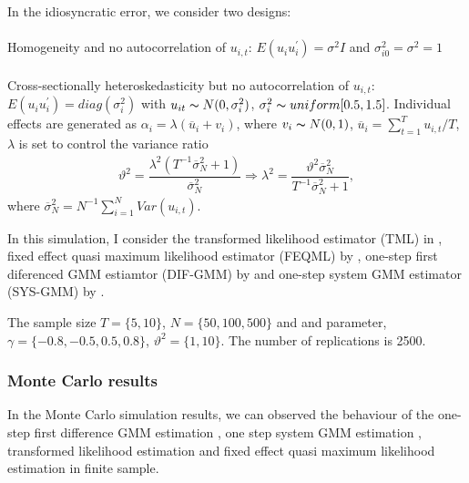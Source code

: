 \documentclass[12pt,a4paper,hyperref]{article}
\begin{document}
In the idiosyncratic error, we consider two designs: \\ \\
\uppercase\expandafter{} Homogeneity and no autocorrelation of $u_{i,t}$: $E(u_{i}u_{i}^{'})=\sigma^{2}I$ and $\sigma^{2}_{i0}=\sigma^{2}=1$ \\ \\
\uppercase\expandafter{} Cross-sectionally heteroskedasticity but no autocorrelation of $u_{i,t}$: $E(u_{i}u_{i}^{'})=diag(\sigma^{2}_{i})$ with $u_{it}\thicksim N(0, \sigma^{2}_{i})$, $\sigma^{2}_{i} \thicksim uniform[0.5, 1.5]$. Individual effects are generated as $\alpha_{i}=\lambda (\overline{u}_{i}+v_{i})$, where $v_{i} \thicksim N(0,1)$, $\overline{u}_{i}=\sum_{t=1}^{T}u_{i,t}/T$, $\lambda$ is set to control the variance ratio
\begin{align}
\vartheta^{2}=\dfrac{\lambda^{2}(T^{-1}\overline{\sigma}^{2}_{N}+1)}{\overline{\sigma}^{2}_{N}}\Rightarrow \lambda^{2}=\dfrac{\vartheta^{2}\overline{\sigma}^{2}_{N}}{T^{-1}\overline{\sigma}^{2}_{N}+1},
\end{align}
where $\overline{\sigma}^{2}_{N}=N^{-1} \sum^{N}_{i=1}Var(u_{i,t})$.

In this simulation, I consider the transformed likelihood estimator (TML) in \citet{Hsiao:2002}, fixed effect quasi maximum likelihood estimator (FEQML) by \citet{Kruiniger:2013}, one-step first diferenced GMM estiamtor (DIF-GMM) by \citet{Arellano:1991} and one-step system GMM estimator (SYS-GMM) by \citet{Blundell:1998}.

The sample size $T=\{5, 10 \}$, $N=\{50, 100, 500 \}$ and  and parameter, $\gamma=\{-0.8, -0.5, 0.5, 0.8\}$,  $\vartheta^{2}=\{1, 10\}$. The number of replications is 2500.  



\subsubsection{Monte Carlo results}
In the Monte Carlo simulation results, we can observed the behaviour of the one-step first difference GMM estimation , one step system GMM estimation , transformed likelihood estimation and fixed effect quasi maximum likelihood estimation in finite sample.
\end{document}
